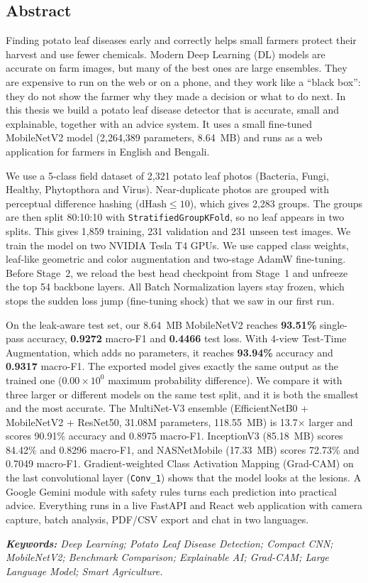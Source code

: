 \begin{center}
    \section*{\textbf{Abstract}}
\end{center}
Finding potato leaf diseases early and correctly helps small farmers protect their harvest and use fewer chemicals. Modern Deep Learning (DL) models are accurate on farm images, but many of the best ones are large ensembles. They are expensive to run on the web or on a phone, and they work like a ``black box'': they do not show the farmer why they made a decision or what to do next. In this thesis we build a potato leaf disease detector that is accurate, small and explainable, together with an advice system. It uses a small fine-tuned MobileNetV2 model (2,264,389 parameters, 8.64~MB) and runs as a web application for farmers in English and Bengali.

We use a 5-class field dataset of 2,321 potato leaf photos (Bacteria, Fungi, Healthy, Phytopthora and Virus). Near-duplicate photos are grouped with perceptual difference hashing ($\text{dHash} \le 10$), which gives 2,283 groups. The groups are then split 80:10:10 with \texttt{StratifiedGroupKFold}, so no leaf appears in two splits. This gives 1,859 training, 231 validation and 231 unseen test images. We train the model on two NVIDIA Tesla T4 GPUs. We use capped class weights, leaf-like geometric and color augmentation and two-stage AdamW fine-tuning. Before Stage~2, we reload the best head checkpoint from Stage~1 and unfreeze the top 54 backbone layers. All Batch Normalization layers stay frozen, which stops the sudden loss jump (fine-tuning shock) that we saw in our first run.

On the leak-aware test set, our 8.64~MB MobileNetV2 reaches \textbf{93.51\%} single-pass accuracy, \textbf{0.9272} macro-F1 and \textbf{0.4466} test loss. With 4-view Test-Time Augmentation, which adds no parameters, it reaches \textbf{93.94\%} accuracy and \textbf{0.9317} macro-F1. The exported model gives exactly the same output as the trained one ($0.00 \times 10^{0}$ maximum probability difference). We compare it with three larger or different models on the same test split, and it is both the smallest and the most accurate. The MultiNet-V3 ensemble (EfficientNetB0 + MobileNetV2 + ResNet50, 31.08M parameters, 118.55~MB) is 13.7$\times$ larger and scores 90.91\% accuracy and 0.8975 macro-F1. InceptionV3 (85.18~MB) scores 84.42\% and 0.8296 macro-F1, and NASNetMobile (17.33~MB) scores 72.73\% and 0.7049 macro-F1. Gradient-weighted Class Activation Mapping (Grad-CAM) on the last convolutional layer (\texttt{Conv\_1}) shows that the model looks at the lesions. A Google Gemini module with safety rules turns each prediction into practical advice. Everything runs in a live FastAPI and React web application with camera capture, batch analysis, PDF/CSV export and chat in two languages.

\vspace{5mm}

\textit{\textbf{Keywords:} Deep Learning; Potato Leaf Disease Detection; Compact CNN; MobileNetV2; Benchmark Comparison; Explainable AI; Grad-CAM; Large Language Model; Smart Agriculture.}
